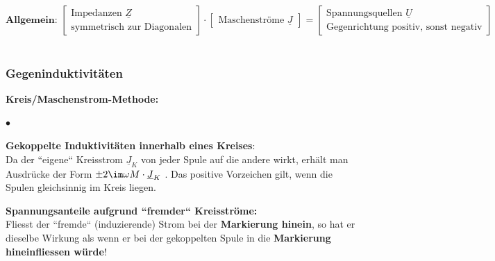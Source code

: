 $$\textbf{Allgemein: }\left[ \begin{array}{cc}
       \text{Impedanzen $\underline{Z}$} \\
       \text{symmetrisch zur Diagonalen}
       \end{array}\right] \cdot \left[ \begin{array}{cc}
     \text{Maschenströme $\underline{J}$}
     \end{array}\right] =
\left[ \begin{array}{cc}
     \text{Spannungsquellen $\underline{U}$} \\
    \text{Gegenrichtung positiv, sonst negativ}
     \end{array}\right]$$\\

\subsubsection{Gegeninduktivitäten}
	\textbf{Kreis/Maschenstrom-Methode:}
	\begin{list}{$\bullet$}{\setlength{\itemsep}{0cm} \setlength{\parsep}{0cm} \setlength{\topsep}{0cm}} 
	
		\item {\textbf{Gekoppelte Induktivitäten innerhalb eines Kreises}:\\
		Da der ``eigene`` Kreisstrom $\underline{J}_K$ von jeder Spule auf die andere wirkt, erhält man Ausdrücke der Form $\pm 2 \im\omega M \cdot \underline{J}_K$ . Das positive Vorzeichen gilt, wenn die Spulen gleichsinnig im Kreis liegen.\\}
		\item {\textbf{Spannungsanteile aufgrund ``fremder`` Kreisströme:}\\
		Fliesst der ``fremde`` (induzierende) Strom bei der \textbf{Markierung hinein}, so hat er dieselbe
		Wirkung als wenn er bei der gekoppelten Spule in die \textbf{Markierung
		hineinfliessen würde}!}\\
		
	\end{list}

